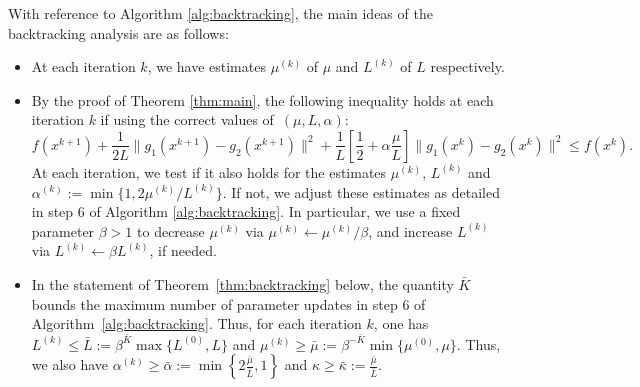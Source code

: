 \documentclass{article} %
\renewcommand{\leq}{\leqslant}
\renewcommand{\geq}{\geqslant}
\begin{document}
{With reference to Algorithm \ref{alg:backtracking}, the main ideas of the backtracking analysis are as follows:
\begin{itemize}
    \item 
At each iteration $k$, we have estimates $\mu^{(k)}$ of $\mu$ and 
$L^{(k)}$ of $L$ respectively.
    \item
    By the proof of Theorem \ref{thm:main}, the following
    inequality  holds at each iteration $k$ if using the correct values of~$(\mu,L,\alpha)$:\begin{equation}\label{eq:one_iteration_inequality}
           f(x^{k+1})+\frac{1}{2L}\|g_1(x^{k+1})-g_2(x^{k+1})\|^2+
         \frac1L \left[\frac12 +\alpha \frac\mu L\right]\|g_1(x^k)-g_2(x^k)\|^2
         \leq  f(x^k).
  \end{equation}
  At each iteration, we test if it also holds for the estimates $\mu^{(k)}$,
$L^{(k)}$ and $\alpha^{(k)} := \min \{1,2\mu^{(k)}/L^{(k)}\}$. If not, we adjust these estimates as detailed in step 6 of Algorithm \ref{alg:backtracking}. In particular, we use a fixed parameter $\beta > 1$ to decrease $\mu^{(k)}$
via $\mu^{(k)}\leftarrow \mu^{(k)}/\beta$, and increase $L^{(k)}$ via $L^{(k)}\leftarrow \beta L^{(k)}$, if needed.
\item 
In the statement of Theorem~\ref{thm:backtracking} below, the quantity $\bar{K}$ bounds the maximum number of parameter updates in step 6 of Algorithm~\ref{alg:backtracking}. Thus, for each iteration $k$, one has $L^{(k)}\leq \bar{L}:=\beta^{\bar{K}}\max\{L^{(0)}, L\}$ and $\mu^{(k)}\geq\bar{\mu}:= \beta^{-\bar{K}}\min\{\mu^{(0)},\mu\}$. Thus, we also have $\alpha^{(k)}\geq \bar{\alpha}:=\min\left\{2\frac{\bar{\mu}}{\bar{L}},1\right\}$ and $\kappa\geq \bar{\kappa}:=\frac{\bar{\mu}}{\bar{L}}$.
\end{itemize}



}
\end{document}
